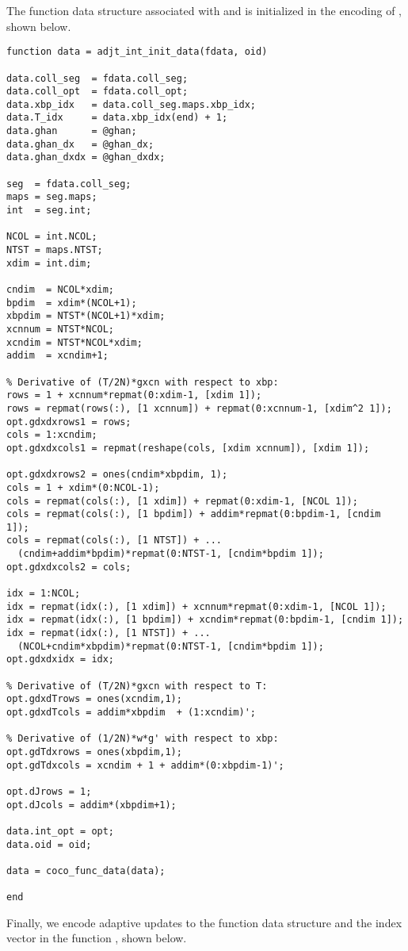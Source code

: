 The function data structure associated with  and  is initialized in the encoding of , shown below.
\begin{lstlisting}[language=coco-highlight]
function data = adjt_int_init_data(fdata, oid)

data.coll_seg  = fdata.coll_seg;
data.coll_opt  = fdata.coll_opt;
data.xbp_idx   = data.coll_seg.maps.xbp_idx;
data.T_idx     = data.xbp_idx(end) + 1;
data.ghan      = @ghan;
data.ghan_dx   = @ghan_dx;
data.ghan_dxdx = @ghan_dxdx;

seg  = fdata.coll_seg;
maps = seg.maps;
int  = seg.int;

NCOL = int.NCOL;
NTST = maps.NTST;
xdim = int.dim;

cndim  = NCOL*xdim;
bpdim  = xdim*(NCOL+1);
xbpdim = NTST*(NCOL+1)*xdim;
xcnnum = NTST*NCOL;
xcndim = NTST*NCOL*xdim;
addim  = xcndim+1;

% Derivative of (T/2N)*gxcn with respect to xbp:
rows = 1 + xcnnum*repmat(0:xdim-1, [xdim 1]);
rows = repmat(rows(:), [1 xcnnum]) + repmat(0:xcnnum-1, [xdim^2 1]);
opt.gdxdxrows1 = rows;
cols = 1:xcndim;
opt.gdxdxcols1 = repmat(reshape(cols, [xdim xcnnum]), [xdim 1]);

opt.gdxdxrows2 = ones(cndim*xbpdim, 1);
cols = 1 + xdim*(0:NCOL-1);
cols = repmat(cols(:), [1 xdim]) + repmat(0:xdim-1, [NCOL 1]);
cols = repmat(cols(:), [1 bpdim]) + addim*repmat(0:bpdim-1, [cndim 1]);
cols = repmat(cols(:), [1 NTST]) + ...
  (cndim+addim*bpdim)*repmat(0:NTST-1, [cndim*bpdim 1]);
opt.gdxdxcols2 = cols;

idx = 1:NCOL;
idx = repmat(idx(:), [1 xdim]) + xcnnum*repmat(0:xdim-1, [NCOL 1]);
idx = repmat(idx(:), [1 bpdim]) + xcndim*repmat(0:bpdim-1, [cndim 1]);
idx = repmat(idx(:), [1 NTST]) + ...
  (NCOL+cndim*xbpdim)*repmat(0:NTST-1, [cndim*bpdim 1]);
opt.gdxdxidx = idx;

% Derivative of (T/2N)*gxcn with respect to T:
opt.gdxdTrows = ones(xcndim,1);
opt.gdxdTcols = addim*xbpdim  + (1:xcndim)';

% Derivative of (1/2N)*w*g' with respect to xbp:
opt.gdTdxrows = ones(xbpdim,1);
opt.gdTdxcols = xcndim + 1 + addim*(0:xbpdim-1)';

opt.dJrows = 1;
opt.dJcols = addim*(xbpdim+1);

data.int_opt = opt;
data.oid = oid;

data = coco_func_data(data);

end
\end{lstlisting}
Finally, we encode adaptive updates to the function data structure and the  index vector in the function , shown below.
